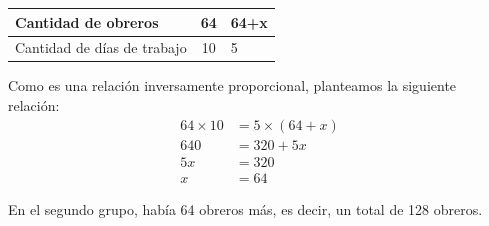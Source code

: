 \documentclass[11pt]{book}
\begin{document}
\begin{table}[H]
  \centering
  \begin{tabular}{|l|c|l|}
    \hline
    Cantidad de obreros         & 64 & 64+x \\
    \hline
    Cantidad de días de trabajo & 10 & 5    \\
    \hline
  \end{tabular}
\end{table}

Como es una relación inversamente proporcional, planteamos la siguiente relación:
\begin{align*}
  64 \times 10 & = 5 \times (64+x) \\
  640          & = 320 +5x         \\
  5x           & = 320             \\
  x            & = 64
\end{align*}

En el segundo grupo, había 64 obreros más, es decir, un total de 128 obreros.


\newpage
\end{document}
